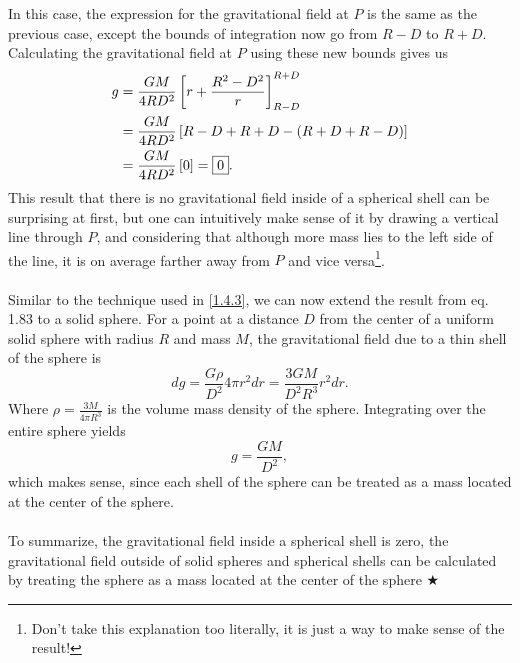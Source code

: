 \noindent In this case, the expression for the gravitational field at $P$ is the same as the previous case, except the bounds of integration now go from $R-D$ to $R+D$. Calculating the gravitational field at $P$ using these new bounds gives us
\begin{align}
    g &= \frac{GM}{4RD^2}\left[r + \frac{R^2 - D^2}{r}\right]_{R-D}^{R+D} \nonumber \\
    &= \frac{GM}{4RD^2}\left[R - D + R + D - (R + D + R - D)\right] \nonumber \\
    &= \frac{GM}{4RD^2}\left[0\right] = \boxed{0}.
\end{align}
\noindent This result that there is no gravitational field inside of a spherical shell can be surprising at first, but one can intuitively make sense of it by drawing a vertical line through $P$, and considering that although more mass lies to the left side of the line, it is on average farther away from $P$ and vice versa\footnote{Don't take this explanation too literally, it is just a way to make sense of the result!}.\\
\\
\noindent Similar to the technique used in \ref{1.4.3}, we can now extend the result from eq. 1.83 to a solid sphere. For a point at a distance $D$ from the center of a uniform solid sphere with radius $R$ and mass $M$, the gravitational field due to a thin shell of the sphere is
\begin{equation*}
    dg = \frac{G\rho}{D^2}4\pi r^2 dr = \frac{3GM}{D^2R^3}r^2 dr.
\end{equation*}
\noindent Where $\rho = \frac{3M}{4\pi R^3}$ is the volume mass density of the sphere. Integrating over the entire sphere yields
\begin{equation}
    g = \boxed{\frac{GM}{D^2}},
\end{equation}
\noindent which makes sense, since each shell of the sphere can be treated as a mass located at the center of the sphere. \\
\\
\noindent To summarize, the gravitational field inside a spherical shell is zero, the gravitational field outside of solid spheres and spherical shells can be calculated by treating the sphere as a mass located at the center of the sphere $\bigstar$

\clearpage

%
%
%
%

